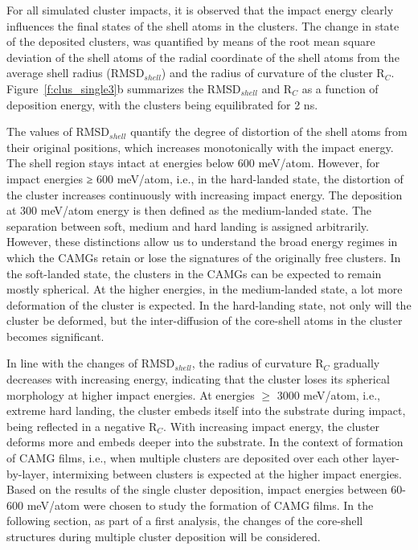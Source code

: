 \begin{selfcite}
For all simulated cluster impacts, it is observed that the impact energy clearly influences the final states of the shell atoms in the clusters. The change in state of the deposited clusters, was quantified by means of the root mean square deviation of the shell atoms of the radial coordinate of the shell atoms from the average shell radius (RMSD$ _{shell}$) and the radius of curvature of the cluster R$ _{C} $. Figure~\ref{f:clus_single3}b summarizes the RMSD$ _{shell}$ and R$ _{C} $ as a function of deposition energy, with the clusters being equilibrated for 2 ns. \par

The values of RMSD$ _{shell}$ quantify the degree of distortion of the shell atoms from their original positions, which increases monotonically with the impact energy. The shell region stays intact at energies below 600 meV/atom. However, for impact energies ≥ 600 meV/atom, i.e., in the hard-landed state, the distortion of the cluster increases continuously with increasing impact energy. The deposition at 300 meV/atom energy is then defined as the medium-landed state. The separation between soft, medium and hard landing is assigned arbitrarily. However, these distinctions allow us to understand the broad energy regimes in which the CAMGs retain or lose the signatures of the originally free clusters. In the soft-landed state, the clusters in the CAMGs can be expected to remain mostly spherical. At the higher energies, in the medium-landed state, a lot more deformation of the cluster is expected. In the hard-landing state, not only will the cluster be deformed, but the inter-diffusion of the core-shell atoms in the cluster becomes significant. \par

In line with the changes of RMSD$ _{shell}$, the radius of curvature R$ _{C} $ gradually decreases with increasing energy, indicating that the cluster loses its spherical morphology at higher impact energies. At energies $\geq$ 3000 meV/atom, i.e., extreme hard landing, the cluster embeds itself into the substrate during impact, being reflected in a negative R$ _{C} $. With increasing impact energy, the cluster deforms more and embeds deeper into the substrate. In the context of formation of CAMG films, i.e., when multiple clusters are deposited over each other layer-by-layer, intermixing between clusters is expected at the higher impact energies. Based on the results of the single cluster deposition, impact energies between 60-600 meV/atom were chosen to study the formation of CAMG films. In the following section, as part of a first analysis, the changes of the core-shell structures during multiple cluster deposition will be considered.

\end{selfcite}

